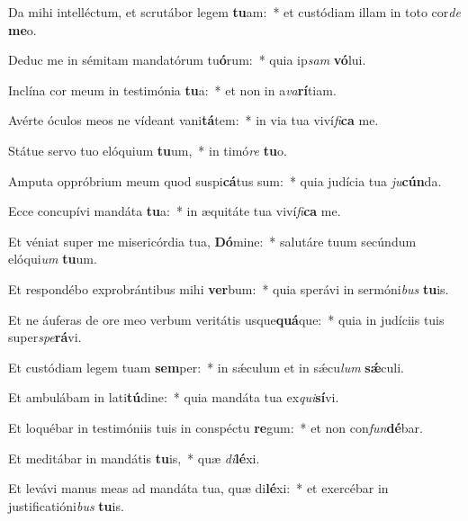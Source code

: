 \item Da mihi intelléctum, et scrutábor legem \textbf{tu}am:~* et custódiam illam in toto cor\textit{de} \textbf{me}o.
\item Deduc me in sémitam mandatórum tu\textbf{ó}rum:~* quia ip\textit{sam} \textbf{vó}lui.
\item Inclína cor meum in testimónia \textbf{tu}a:~* et non in a\textit{va}\textbf{rí}tiam.
\item Avérte óculos meos ne vídeant vani\textbf{tá}tem:~* in via tua viví\textit{fi}\textbf{ca} me.
\item Státue servo tuo elóquium \textbf{tu}um,~* in timó\textit{re} \textbf{tu}o.
\item Amputa oppróbrium meum quod suspi\textbf{cá}tus sum:~* quia judícia tua \textit{ju}\textbf{cún}da.
\item Ecce concupívi mandáta \textbf{tu}a:~* in æquitáte tua viví\textit{fi}\textbf{ca} me.
\item Et véniat super me misericórdia tua, \textbf{Dó}mine:~* salutáre tuum secúndum elóqui\textit{um} \textbf{tu}um.
\item Et respondébo exprobrántibus mihi \textbf{ver}bum:~* quia sperávi in sermóni\textit{bus} \textbf{tu}is.
\item Et ne áuferas de ore meo verbum veritátis usque\textbf{quá}que:~* quia in judíciis tuis super\textit{spe}\textbf{rá}vi.
\item Et custódiam legem tuam \textbf{sem}per:~* in sǽculum et in sǽcu\textit{lum} \textbf{sǽ}culi.
\item Et ambulábam in lati\textbf{tú}dine:~* quia mandáta tua ex\textit{qui}\textbf{sí}vi.
\item Et loquébar in testimóniis tuis in conspéctu \textbf{re}gum:~* et non con\textit{fun}\textbf{dé}bar.
\item Et meditábar in mandátis \textbf{tu}is,~* quæ \textit{di}\textbf{lé}xi.
\item Et levávi manus meas ad mandáta tua, quæ di\textbf{lé}xi:~* et exercébar in justificatióni\textit{bus} \textbf{tu}is.
